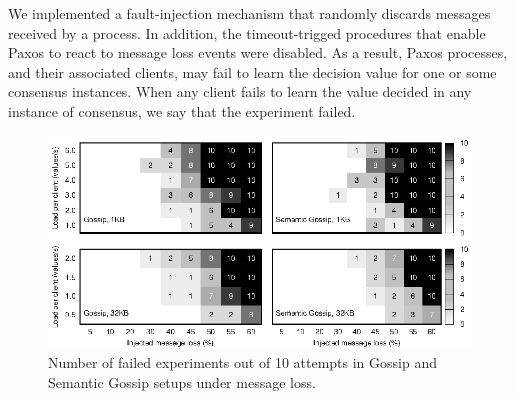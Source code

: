 We implemented a fault-injection mechanism that randomly discards messages
received by a process.
In addition, the timeout-trigged procedures that enable Paxos to react to
message loss events were disabled.
As a result, Paxos processes, and their associated clients, may fail to learn
the decision value for one or some consensus instances.
When any client fails to learn the value decided in any instance of consensus,
we say that the experiment failed.


\begin{figure}
\includegraphics[width=1.02\columnwidth]{figures/heatmap-multiplot.eps}
\caption{Number of failed experiments out of 10 attempts in Gossip and Semantic
	Gossip setups under message loss.}
\label{fig:heatmaps}
\end{figure}

